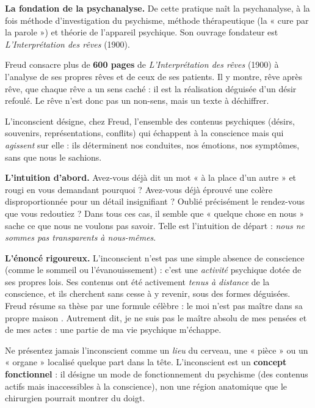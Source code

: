 \documentclass[11pt]{article}
\newcommand{\cle}[1]{{\popxbold\color{popdark}#1}}
\newcounter{popsec}
\newcounter{popsub}
\newcommand{\courssub}[1]{%
  \stepcounter{popsub}%
  \par\vspace{9pt}\noindent{\popxbold\fontsize{11.5}{13}\selectfont\color{popink}{\color{poporange}\thepopsec.\thepopsub}\hspace{6pt}#1}\par\nopagebreak\vspace{4pt}
}
\begin{document}
\textbf{La fondation de la psychanalyse.} De cette pratique naît la \cle{psychanalyse}, à la fois méthode d'investigation du psychisme, méthode thérapeutique (la « cure par la parole ») et théorie de l'appareil psychique. Son ouvrage fondateur est \emph{L'Interprétation des rêves} (1900).

\begin{exemplebox}
Freud consacre plus de \textbf{600 pages} de \emph{L'Interprétation des rêves} (1900) à l'analyse de ses propres rêves et de ceux de ses patients. Il y montre, rêve après rêve, que chaque rêve a un sens caché : il est la réalisation déguisée d'un désir refoulé. Le rêve n'est donc pas un non-sens, mais un texte à déchiffrer.
\end{exemplebox}

\courssub{L'hypothèse de l'inconscient}

\begin{definition}[L'inconscient]
L'\cle{inconscient} désigne, chez Freud, l'ensemble des contenus psychiques (désirs, souvenirs, représentations, conflits) qui échappent à la conscience mais qui \emph{agissent} sur elle : ils déterminent nos conduites, nos émotions, nos symptômes, sans que nous le sachions.
\end{definition}

\textbf{L'intuition d'abord.} Avez-vous déjà dit un mot « à la place d'un autre » et rougi en vous demandant pourquoi ? Avez-vous déjà éprouvé une colère disproportionnée pour un détail insignifiant ? Oublié précisément le rendez-vous que vous redoutiez ? Dans tous ces cas, il semble que « quelque chose en nous » sache ce que nous ne voulons pas savoir. Telle est l'intuition de départ : \emph{nous ne sommes pas transparents à nous-mêmes}.

\textbf{L'énoncé rigoureux.} L'inconscient n'est pas une simple absence de conscience (comme le sommeil ou l'évanouissement) : c'est une \emph{activité} psychique dotée de ses propres lois. Ses contenus ont été activement \emph{tenus à distance} de la conscience, et ils cherchent sans cesse à y revenir, sous des formes déguisées. Freud résume sa thèse par une formule célèbre : \og le moi n'est pas maître dans sa propre maison \fg{}. Autrement dit, je ne suis pas le maître absolu de mes pensées et de mes actes : une partie de ma vie psychique m'échappe.

\begin{attention}
Ne présentez jamais l'inconscient comme un \emph{lieu} du cerveau, une « pièce » ou un « organe » localisé quelque part dans la tête. L'inconscient est un \textbf{concept fonctionnel} : il désigne un mode de fonctionnement du psychisme (des contenus actifs mais inaccessibles à la conscience), non une région anatomique que le chirurgien pourrait montrer du doigt.
\end{attention}
\end{document}
